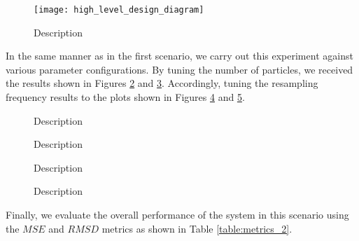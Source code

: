 \begin{figure}
    \centering
    \texttt{[image: high\_level\_design\_diagram]}
    \caption[Name]{
        Description
    }
    \label{fig:bird_2}
\end{figure}

In the same manner as in the first scenario, we carry out this experiment
against various parameter configurations.
By tuning the number of particles, we received the results shown in Figures
\ref{fig:mean_error_vs_particles_2} and \ref{fig:std_error_vs_particles_2}.
Accordingly, tuning the resampling frequency results to the plots shown in
Figures \ref{fig:mean_error_vs_resampling_2} and
\ref{fig:std_error_vs_resampling_2}.

\begin{figure}
    \centering
    
    \caption[Name]{
        Description
    }
    \label{fig:mean_error_vs_particles_2}
\end{figure}

\begin{figure}
    \centering
    
    \caption[Name]{
        Description
    }
    \label{fig:std_error_vs_particles_2}
\end{figure}

\begin{figure}
    \centering
    
    \caption[Name]{
        Description
    }
    \label{fig:mean_error_vs_resampling_2}
\end{figure}

\begin{figure}
    \centering
    
    \caption[Name]{
        Description
    }
    \label{fig:std_error_vs_resampling_2}
\end{figure}

Finally, we evaluate the overall performance of the system in this scenario
using the $MSE$ and $RMSD$ metrics as shown in Table \ref{table:metrics_2}.

